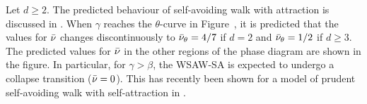 Let $d \ge 2$. The predicted behaviour of self-avoiding walk with attraction is discussed
in \cite{Vand98}.
When $\gamma$ reaches the $\theta$-curve in Figure~\REF, it is predicted
that the values for $\bar\nu$ changes discontinuously to $\bar\nu_\theta = 4/7$ if $d = 2$
and $\bar\nu_\theta = 1/2$ if $d \ge 3$. The predicted values for $\bar\nu$
in the other regions of the phase diagram are shown in the figure. In particular, for
$\gamma > \beta$, the WSAW-SA is expected to undergo a collapse transition ($\bar\nu = 0$).
This has recently been shown for a model of prudent self-avoiding walk with self-attraction
in \cite{PT16}.

